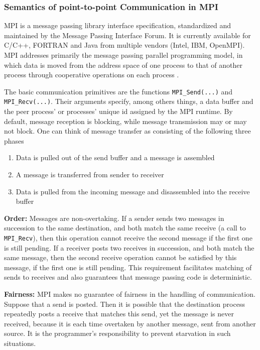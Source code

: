 \documentclass[11pt]{article}
\begin{document}
\subsubsection{Semantics of point-to-point Communication in MPI}
\label{sec:org0ff3938}
MPI is a message passing library interface specification, standardized and maintained by the Message Passing Interface Forum.
It is currently available for C/C++, FORTRAN and Java from multiple vendors (Intel, IBM, OpenMPI).
MPI addresses primarily the message passing parallel programming model, 
in which data is moved from the address space of one process to that of another process through cooperative operations on each process \cite{MessagePassingInterfaceForum2012}.

The basic communication primitives are the functions \texttt{MPI\_Send(...)} and \texttt{MPI\_Recv(...)}.
Their arguments specify, among others things, a data buffer and the peer process' or processes' unique id assigned by the MPI runtime.
By default, message reception is blocking, while message transmission may or may not block.
One can think of message transfer as consisting of the following three phases
\begin{enumerate}
\item Data is pulled out of the send buffer and a message is assembled
\item A message is transferred from sender to receiver
\item Data is pulled from the incoming message and disassembled into the receive buffer
\end{enumerate}

\textbf{Order:}
Messages are non-overtaking.
If a sender sends two messages in succession to the same destination, 
and both match the same receive (a call to \texttt{MPI\_Recv}), 
then this operation cannot receive the second message if the first one is still pending. 
If a receiver posts two receives in succession,
and both match the same message, 
then the second receive operation cannot be satisfied by this message, if the first one is still pending. 
This requirement facilitates matching of sends to receives and also guarantees that message passing code is deterministic.

\textbf{Fairness:}
MPI makes no guarantee of fairness in the handling of communication. 
Suppose that a send is posted. 
Then it is possible that the destination process repeatedly posts a receive that matches this send, 
yet the message is never received, 
because it is each time overtaken by another message, 
sent from another source. 
It is the programmer’s responsibility to prevent starvation in such situations.
\end{document}
